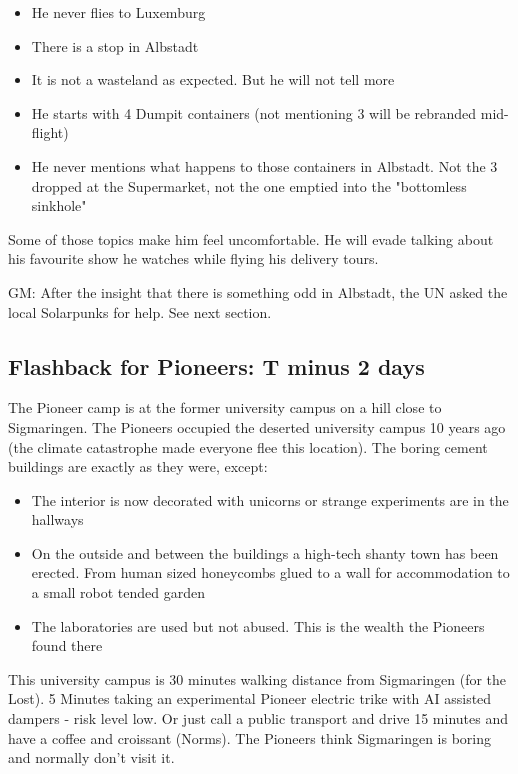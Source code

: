 \begin{itemize}
    \item He never flies to Luxemburg
    \item There is a stop in Albstadt
    \item It is not a wasteland as expected. But he will not tell more
    \item He starts with 4 Dumpit containers (not mentioning 3 will be rebranded mid-flight)
    \item He never mentions what happens to those containers in Albstadt. Not the 3 dropped at the Supermarket, not the one emptied into the "bottomless sinkhole"
\end{itemize}

Some of those topics make him feel uncomfortable. He will evade talking about his favourite show he watches while flying his delivery tours.

GM: After the insight that there is something odd in Albstadt, the UN asked the local Solarpunks for help. See next section.

\subsection{Flashback for Pioneers: T minus 2 days}

The Pioneer camp is at the former university campus on a hill close to Sigmaringen. The Pioneers occupied the deserted university campus 10 years ago (the climate catastrophe made everyone flee this location). The boring cement buildings are exactly as they were, except:

\begin{itemize}
    \item The interior is now decorated with unicorns or strange experiments are in the hallways
    \item On the outside and between the buildings a high-tech shanty town has been erected. From human sized honeycombs glued to a wall for accommodation to a small robot tended garden
    \item The laboratories are used but not abused. This is the wealth the Pioneers found there
\end{itemize}

This university campus is 30 minutes walking distance from Sigmaringen (for the Lost). 5 Minutes taking an experimental Pioneer electric trike with AI assisted dampers - risk level low. Or just call a public transport and drive 15 minutes and have a coffee and croissant (Norms).
The Pioneers think Sigmaringen is boring and normally don't visit it.

